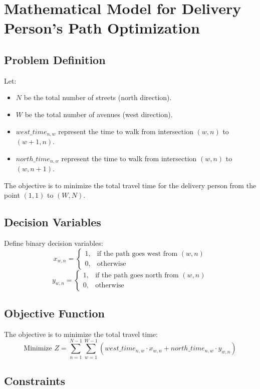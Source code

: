 \documentclass{article}
\begin{document}
\section*{Mathematical Model for Delivery Person's Path Optimization}

\subsection*{Problem Definition}

Let:
\begin{itemize}
    \item \( N \) be the total number of streets (north direction).
    \item \( W \) be the total number of avenues (west direction).
    \item \( west\_time_{n,w} \) represent the time to walk from intersection \((w, n)\) to \((w+1, n)\).
    \item \( north\_time_{n,w} \) represent the time to walk from intersection \((w, n)\) to \((w, n+1)\).
\end{itemize}

The objective is to minimize the total travel time for the delivery person from the point \((1, 1)\) to \((W, N)\).

\subsection*{Decision Variables}

Define binary decision variables:
\[
x_{w,n} = 
\begin{cases}
    1, & \text{if the path goes west from } (w,n) \\
    0, & \text{otherwise}
\end{cases}
\]
\[
y_{w,n} = 
\begin{cases}
    1, & \text{if the path goes north from } (w,n) \\
    0, & \text{otherwise}
\end{cases}
\]

\subsection*{Objective Function}

The objective is to minimize the total travel time:
\[
\text{Minimize } Z = \sum_{n=1}^{N-1} \sum_{w=1}^{W-1} (west\_time_{n,w} \cdot x_{w,n} + north\_time_{n,w} \cdot y_{w,n})
\]

\subsection*{Constraints}
\end{document}
